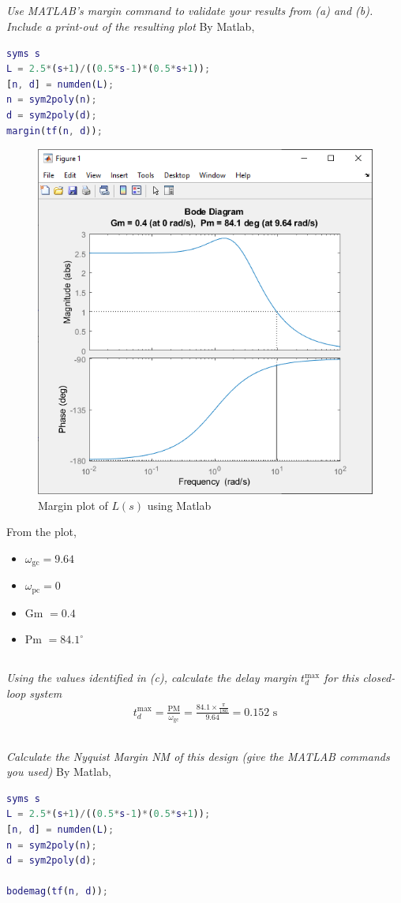 \subsection{}
\textit{Use MATLAB’s margin command to validate your results from (a) and (b). Include a print-out
of the resulting plot}
By Matlab,
\begin{lstlisting}[language=Matlab]
syms s
L = 2.5*(s+1)/((0.5*s-1)*(0.5*s+1));
[n, d] = numden(L);
n = sym2poly(n);
d = sym2poly(d);
margin(tf(n, d));
\end{lstlisting}
\begin{figure}[h]
    \centering
    \includegraphics[width=0.5\linewidth]{Questions/Figures/Q2 Matlab Margin.png}
    \caption{Margin plot of $L(s)$ using Matlab}
    \label{fig:Q2 Matlab Margin}
\end{figure}
From the plot,
\begin{itemize}
    \item $\omega_{\text{gc}} = 9.64$
    \item $\omega_{\text{pc}} = 0$
    \item Gm $=0.4$
    \item Pm $=84.1^\circ$
\end{itemize}

\subsection{}
\textit{Using the values identified in (c), calculate the delay margin $t_{d}^{\text{max}}$ for this closed-loop system}
\begin{align*}
    t_{d}^{\text{max}} = \frac{\text{PM}}{\omega_{\text{gc}}} = \frac{84.1\times \frac{\pi}{180}}{9.64} = 0.152 \text{ s}
\end{align*}

\subsection{}
\textit{Calculate the Nyquist Margin NM of this design (give the MATLAB commands you used)}
By Matlab,
\begin{lstlisting}[language=Matlab]
syms s
L = 2.5*(s+1)/((0.5*s-1)*(0.5*s+1));
[n, d] = numden(L);
n = sym2poly(n);
d = sym2poly(d);

bodemag(tf(n, d));
\end{lstlisting}

